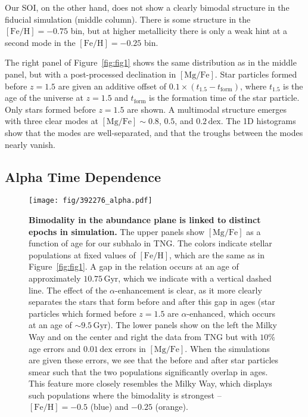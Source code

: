 \documentclass[linenumbers, twocolumn]{aastex631}
\newcommand{\Gyr}{\ensuremath{\textrm{Gyr}}}
\newcommand{\FeH}{\ensuremath{[\textrm{Fe}/\textrm{H}]}}
\newcommand{\MgFe}{\ensuremath{[\textrm{Mg}/\textrm{Fe}]}}
\newcommand{\dex}{\ensuremath{\textrm{dex}}}
\begin{document}
Our SOI, on the other hand, does not show a clearly bimodal structure in the fiducial simulation (middle column). There is some structure in the $\FeH=-0.75$ bin, but at higher metallicity there is only a weak hint at a second mode in the $\FeH=-0.25$ bin.

The right panel of Figure~\ref{fig:fig1} shows the same distribution as in the middle panel, but with a post-processed declination in \MgFe{}. Star particles formed before $z=1.5$ are given an additive offset of $0.1\times\left(t_{1.5}-t_{\textrm{form}}\right)$, where $t_{1.5}$ is the age of the universe at $z=1.5$ and $t_{\textrm{form}}$ is the formation time of the star particle. Only stars formed before $z=1.5$ are shown. A multimodal structure emerges with three clear modes at $\MgFe\sim0.8$, $0.5$, and $0.2\,\dex$. The 1D histograms show that the modes are well-separated, and that the troughs between the modes nearly vanish.

\subsection{Alpha Time Dependence}\label{ssec:alpha_time}

\begin{figure*}
  \centering
  \texttt{[image: fig/392276\_alpha.pdf]}
  \caption{\textbf{Bimodality in the abundance plane is linked to distinct epochs in simulation.} The upper panels show \MgFe{} as a function of age for our subhalo in TNG. The colors indicate stellar populations at fixed values of \FeH{}, which are the same as in Figure~\ref{fig:fig1}. A gap in the relation occurs at an age of approximately $10.75\,\Gyr$, which we indicate with a vertical dashed line. The effect of the $\alpha$-enhancement is clear, as it more clearly separates the stars that form before and after this gap in ages (star particles which formed before $z=1.5$ are $\alpha$-enhanced, which occurs at an age of $\sim9.5\,\Gyr$). The lower panels show on the left the Milky Way and on the center and right the data from TNG but with $10\%$ age errors and $0.01\,\dex$ errors in \MgFe{}. When the simulations are given these errors, we see that the before and after star particles smear such that the two populations significantly overlap in ages. This feature more closely resembles the Milky Way, which displays such populations where the bimodality is strongest -- $\FeH=-0.5$ (blue) and $-0.25$ (orange).}
  \label{fig:alpha}
\end{figure*}
\end{document}
